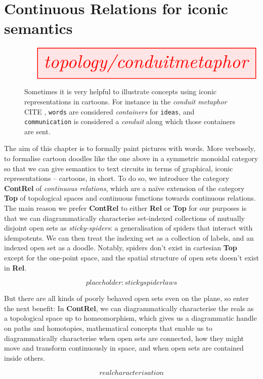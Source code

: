 \section{Continuous Relations for iconic semantics}\label{sec:contrelintro}

\begin{figure}[h!]
\centering
\[\resizebox{\textwidth}{!}{\tikzfig{topology/conduitmetaphor}}\]
\caption{Sometimes it is very helpful to illustrate concepts using iconic representations in cartoons. For instance in the \emph{conduit metaphor} \bR CITE \e, \texttt{words} are considered \emph{containers} for \texttt{ideas}, and \texttt{communication} is considered a \emph{conduit} along which those containers are sent.}
\end{figure}

The aim of this chapter is to formally paint pictures with words. More verbosely, to formalise cartoon doodles like the one above in a symmetric monoidal category so that we can give semantics to text circuits in terms of graphical, iconic representations -- cartoons, in short. To do so, we introduce the category \textbf{ContRel} of \emph{continuous relations}, which are a na\"{i}ve extension of the category \textbf{Top} of topological spaces and continuous functions towards continuous relations.\\

The main reason we prefer \textbf{ContRel} to either \textbf{Rel} or \textbf{Top} for our purposes is that we can diagrammatically characterise set-indexed collections of mutually disjoint open sets as \emph{sticky-spiders}: a generalisation of spiders that interact with idempotents. We can then treat the indexing set as a collection of labels, and an indexed open set as a doodle. Notably, spiders don't exist in cartesian \textbf{Top} except for the one-point space, and the spatial structure of open sets doesn't exist in \textbf{Rel}.

\[placeholder: stickyspider laws\]

But there are all kinds of poorly behaved open sets even on the plane, so enter the next benefit: In \textbf{ContRel}, we can diagrammatically characterise the reals as a topological space up to homeomorphism, which gives us a diagrammatic handle on paths and homotopies, mathematical concepts that enable us to diagrammatically characterise when open sets are connected, how they might move and transform continuously in space, and when open sets are contained inside others.

\[real characterisation\]

